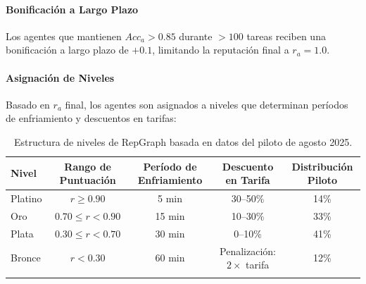 \documentclass[11pt]{article}
\begin{document}
\paragraph{Bonificación a Largo Plazo} Los agentes que mantienen $Acc_a > 0.85$ durante $>100$ tareas reciben una bonificación a largo plazo de $+0.1$, limitando la reputación final a $r_a = 1.0$.

\paragraph{Asignación de Niveles} Basado en $r_a$ final, los agentes son asignados a niveles que determinan períodos de enfriamiento y descuentos en tarifas:
\begin{longtable}{@{}lcccc@{}}
\toprule
\textbf{Nivel} & \textbf{Rango de Puntuación} & \textbf{Período de Enfriamiento} & \textbf{Descuento en Tarifa} & \textbf{Distribución Piloto} \\\midrule
Platino & $r \geq 0.90$ & 5 min & 30--50\% & 14\% \\
Oro & $0.70 \leq r < 0.90$ & 15 min & 10--30\% & 33\% \\
Plata & $0.30 \leq r < 0.70$ & 30 min & 0--10\% & 41\% \\
Bronce & $r < 0.30$ & 60 min & Penalización: $2 \times$ tarifa & 12\% \\\bottomrule
\caption{Estructura de niveles de RepGraph basada en datos del piloto de agosto 2025.}
\label{tab:reputation-tiers}
\end{longtable}
\end{document}
